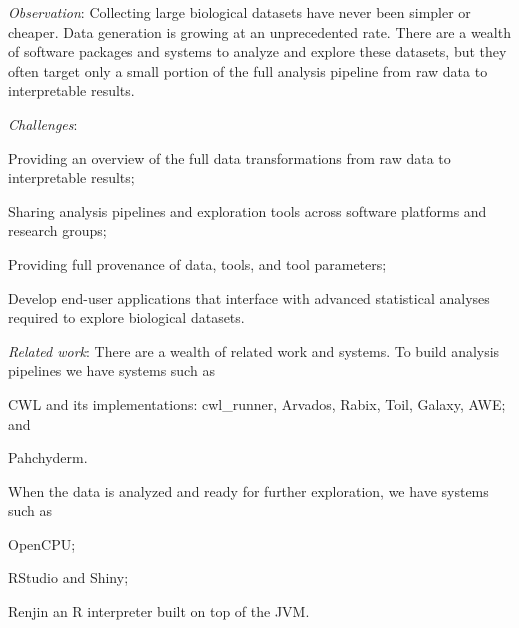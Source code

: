 % 

\emph{Observation}:
Collecting large biological datasets have never been simpler or cheaper. Data
generation is growing at an unprecedented rate. There are a wealth of software
packages and systems to analyze and explore these datasets, but they often
target only a small portion of the full analysis pipeline from raw data to
interpretable results.  

\emph{Challenges}:
\begin{enumerate*}[label=(\roman*)]
    \item Providing an overview of the full data transformations from raw data
        to interpretable results; 
    \item Sharing analysis pipelines and exploration tools across software
        platforms and research groups; 
    \item Providing full provenance of data, tools, and tool parameters; 
    \item Develop end-user applications that interface with advanced
        statistical analyses required to explore biological datasets.  
\end{enumerate*} 

\emph{Related work}:
There are a wealth of related work and systems. To build analysis pipelines we
have systems such as
\begin{enumerate*}[label=(\roman*)]
    \item CWL and its implementations: cwl\_runner, Arvados, Rabix, Toil, Galaxy,
        AWE; and 
    \item Pahchyderm. 
\end{enumerate*}
When the data is analyzed and ready for further exploration, we have systems
such as
\begin{enumerate*}[label=(\roman*)]
    \item OpenCPU;
    \item RStudio and Shiny; 
    \item Renjin an R interpreter built on top of the JVM. 
\end{enumerate*}
 

